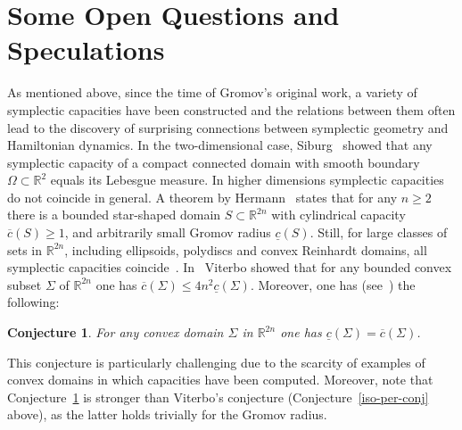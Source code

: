 \documentclass{icmart}
\newtheorem{conjecture}[theorem]{Conjecture}
\theoremstyle{definition}
\newtheorem{remark}[theorem]{Remark}
\begin{document}



\section{Some Open Questions and Speculations} \label{SEC:OQ}


\smallskip

%
As mentioned above, since the time of Gromov's original work, a variety of symplectic capacities have been constructed and the
relations between them often lead to the discovery of surprising connections between symplectic geometry and Hamiltonian dynamics.
In the two-dimensional case, Siburg~\cite{Sib} showed that any symplectic capacity of  a compact connected domain with smooth boundary $\Omega \subset {\mathbb R}^2$ equals its Lebesgue measure. 
In higher dimensions symplectic capacities do not coincide in general. 
A %
theorem  by Hermann~\cite{Her} states that for any $n \geq 2$ there
is a bounded star-shaped %
domain $S \subset {\mathbb R}^{2n}$  with
cylindrical capacity $\overline c(S) \geq 1$, and arbitrarily small Gromov
radius $\underline c(S)$.  Still, for large classes of sets in
${\mathbb R}^{2n}$, including ellipsoids, polydiscs and convex Reinhardt
domains, all symplectic capacities coincide~\cite{Her}. 
In~\cite{V} Viterbo showed that for any bounded convex subset $\Sigma$
 of ${\mathbb R}^{2n}$ one has  $\overline c(\Sigma) \leq 4n^2 \underline c(\Sigma)$. 
Moreover, one has (see~\cite{Her,H2,V}) the following: 
\begin{conjecture} \label{conj-all-cap-coincide}
For any convex domain $\Sigma$ in
${\mathbb R}^{2n}$ one has $\underline c(\Sigma) = \overline c(\Sigma)$.
\end{conjecture}
This conjecture is particularly challenging due to the scarcity of examples of convex domains in which capacities have been  computed. 
Moreover, note that Conjecture~\ref{conj-all-cap-coincide} is stronger than Viterbo's conjecture (Conjecture~\ref{iso-per-conj} above), as the latter holds trivially for
the Gromov radius.
\end{document}
